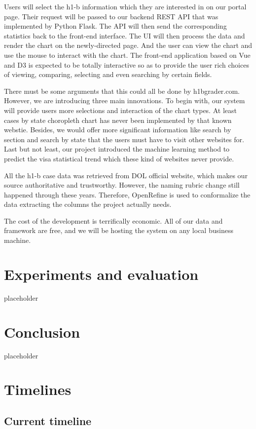 \documentclass[sigconf]{acmart}
\begin{document}
Users will select the h1-b information which they are interested in on our portal page. Their request will be 
passed to our backend REST API that was implemented by Python Flask. The API will then send the corresponding 
statistics back to the front-end interface. The UI will then process the data and render the chart on the newly-directed 
page. And the user can view the chart and use the mouse to interact with the chart. The front-end application 
based on Vue and D3 is expected to be totally interactive so as to provide the user rich choices of viewing, 
comparing, selecting and even searching by certain fields.

There must be some arguments that this could all be done by h1bgrader.com. However, we are introducing three main 
innovations. To begin with, our system will provide users more selections and interaction of the chart types. At least 
cases by state choropleth chart has never been implemented by that known webstie. Besides, we would offer more 
significant information like search by section and search by state that the users must have to visit other websites for. Last but not 
least, our project introduced the machine learning method to predict the visa statistical trend which these kind of 
websites never provide.

All the h1-b case data was retrieved from DOL official website, which makes our source authoritative and trustworthy. 
However, the naming rubric change still happened through these years. Therefore, OpenRefine is used to conformalize the data 
extracting the columns the project actually needs.

The cost of the development is terrifically economic. All of our data and framework are free, and we will be hosting the system 
on any local business machine.

\section{Experiments and evaluation}
placeholder

\section{Conclusion}

placeholder
\appendix
\section{Timelines}
\subsection{Current timeline}
\end{document}
